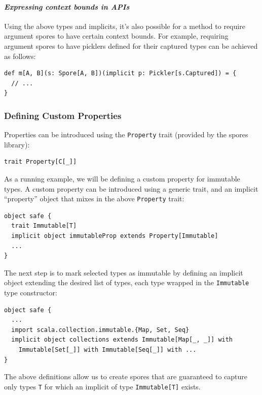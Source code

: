 \documentclass{llncs}
\begin{document}

\paragraph{\textbf{\textit{Expressing context bounds in APIs}}}

Using the above types and implicits, it's also possible for a method
to require argument spores to have certain context bounds. For example,
requiring argument spores to have picklers defined for their captured types
can be achieved as follows:

\begin{lstlisting}
def m[A, B](s: Spore[A, B])(implicit p: Pickler[s.Captured]) = {
  // ...
}
\end{lstlisting}


\subsubsection{Defining Custom Properties}

Properties can be introduced using the \verb|Property| trait (provided by the
spores library):

\begin{lstlisting}[numbers=none]
    trait Property[C[_]]
\end{lstlisting}

As a running example, we will be defining a custom  property for
immutable types. A custom property can be introduced using a generic trait,
and an implicit ``property'' object that mixes in the above \verb|Property|
trait:

\begin{lstlisting}
object safe {
  trait Immutable[T]
  implicit object immutableProp extends Property[Immutable]
  ...
}
\end{lstlisting}
\noindent
The next step is to mark selected types as immutable by defining an implicit object extending the desired list of types, each type wrapped in the \verb|Immutable| type constructor:

\begin{lstlisting}
object safe {
  ...
  import scala.collection.immutable.{Map, Set, Seq}
  implicit object collections extends Immutable[Map[_, _]] with
    Immutable[Set[_]] with Immutable[Seq[_]] with ...
}
\end{lstlisting}

\noindent
The above definitions allow us to create spores that are guaranteed to capture
only types \verb|T| for which an implicit of type \verb|Immutable[T]| exists.
\end{document}
